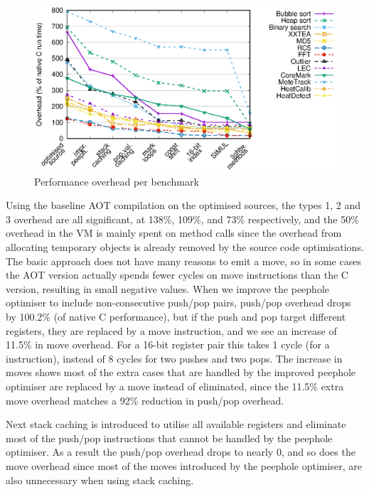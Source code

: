 \begin{figure}
\centering
\includegraphics[width=\mygraphsize]{performance-per-benchmark3a.eps}
\caption{Performance overhead per benchmark}
\label{fig-performance-per-benchmark}
\end{figure}

Using the baseline AOT compilation on the optimised sources, the types 1, 2 and 3 overhead are all significant, at 138\%,  109\%, and 73\% respectively, and the 50\% overhead in the VM is mainly spent on method calls since the overhead from allocating temporary objects is already removed by the source code optimisations. The basic approach does not have many reasons to emit a move, so in some cases the AOT version actually spends fewer cycles on move instructions than the C version, resulting in small negative values.  When we improve the peephole optimiser to include non-consecutive push/pop pairs, push/pop overhead drops by 100.2\% (of native C performance), but if the push and pop target different registers, they are replaced by a move instruction, and we see an increase of 11.5\% in move overhead. For a 16-bit register pair this takes 1 cycle (for a  instruction), instead of 8 cycles for two pushes and two pops. The increase in moves shows most of the extra cases that are handled by the improved peephole optimiser are replaced by a move instead of eliminated, since the 11.5\% extra move overhead matches a 92\% reduction in push/pop overhead.

Next stack caching is introduced to utilise all available registers and eliminate most of the push/pop instructions that cannot be handled by the peephole optimiser. As a result the push/pop overhead drops to nearly 0, and so does the move overhead since most of the moves introduced by the peephole optimiser, are also unnecessary when using stack caching.

